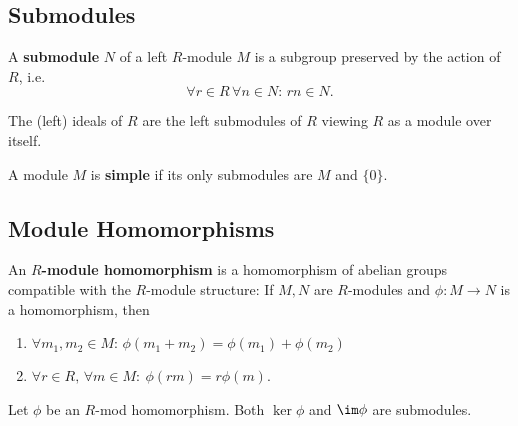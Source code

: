 \subsection*{Submodules}
\begin{definition}[Submodule]
    A \textbf{submodule} $N$ of a left $R$-module $M$ is a subgroup preserved by the action of $R$, i.e. \[
    \forall r \in R \, \forall n \in N: \, rn \in N
    .\] 
\end{definition}
\begin{note}
    The (left) ideals of $R$ are the left submodules of $R$ viewing $R$ as a module over itself.
\end{note}
\begin{definition}
    A module $M$ is \textbf{simple} if its only submodules are $M$ and $\{0\}$.
\end{definition}
\subsection*{Module Homomorphisms}
\begin{definition}
    An $R$\textbf{-module homomorphism} is a homomorphism of abelian groups compatible with the $R$-module structure:
    If $M,N$ are $R$-modules and $\phi: M \to N$ is a homomorphism, then
    \begin{enumerate}
        \item $\forall m_1,m_2 \in M: \, \phi(m_1+m_2)=\phi(m_1)+\phi(m_2)$
        \item $\forall r \in R, \, \forall m \in M: \ \phi(rm)=r\phi(m)$.
    \end{enumerate}
\end{definition}
\begin{theorem}
   Let $\phi$ be an $R$-mod homomorphism. Both $\ker \phi$ and $\im \phi$ are submodules. 
\end{theorem}
